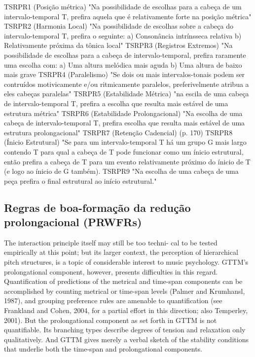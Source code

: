 \documentclass[
	12pt,				%
	openright,			%
	twoside,			%
	a4paper,			%
	english,			%
	french,				%
	spanish,			%
	brazil				%
	]{abntex2}
\begin{document}
\begin{citacao}
TSRPR1 (Posição métrica)  "Na possibilidade de escolhas para a cabeça de um intervalo-temporal T, prefira aquela que é relativamente forte na posição métrica" 
TSRPR2 (Harmonia Local) "Na possibilidade de escolhas sobre a cabeça do intervalo-temporal T, prefira o seguinte: 
a) Consonância intrínsseca relativa 
b) Relativamente próxima da tônica local" 
TSRPR3 (Registros Extremos) "Na possibilidade de escolhas para a cabeça de intervalo-temporal, prefira raramente uma escolha com: 
a) Uma altura melódica mais aguda 
b) Uma altura de baixo mais grave 
TSRPR4 (Paralelismo) "Se dois ou mais intervalos-tonais podem ser contruídos motivicamente e/ou ritmicamente paralelos, preferivelmente atribua a eles cabeças paralelas" 
TSRPR5 (Estabilidade Métrica) "na escila de uma cabeça de intervalo-temporal T, prefira a escolha que resulta mais estável de uma estrutura métrica" 
TSRPR6 (Estabilidade Prolongacional) "Na escolha de uma cabeça de intervalo-temporal T, prefira escolha que resulta mais estável de uma estrutura prolongacional" 
TSRPR7 (Retenção Cadencial) (p. 170) 
TSRPR8 (Ínicio Estrutural) "Se para um intervalo-temporal T há um grupo G mais largo contendo T para qual a cabeça de T pode funcionar como um ínicio estrutural, então prefira a cabeça de T para um evento relativamente próximo do ínicio de T (e logo ao ínicio de G também). 
TSRPR9 "Na escolha de uma cabeça de uma peça prefira o final estrutural ao início estrutural." 
 \cite{lerdahl1983generative}
\end{citacao}

\subsection{Regras de boa-formação da redução prolongacional (PRWFRs) }





The interaction principle itself may still be too techni-
cal to be tested empirically at this point; but its larger
context, the perception of hierarchical pitch structures,
is a topic of considerable interest to music psychology.
GTTM’s prolongational component, however, presents
difficulties in this regard. Quantification of predictions
of the metrical and time-span components can be
accomplished by counting metrical or time-span levels
(Palmer and Krumhansl, 1987), and grouping preference
rules are amenable to quantification (see Frankland and
Cohen, 2004, for a partial effort in this direction; also
Temperley, 2001). But the prolongational component
as set forth in GTTM is not quantifiable. Its branching
types describe degrees of tension and relaxation only
qualitatively. And GTTM gives merely a verbal sketch of
the stability conditions that underlie both the time-span
and prolongational components.
\cite[p. 191]{lerdahl2009genesis}
\end{document}
